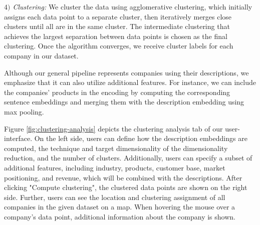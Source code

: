 \documentclass[12pt]{article}
\begin{document}
   \textit{$4)$ Clustering:} We cluster the data using agglomerative clustering, which initially assigns each data point to a separate cluster, then iteratively merges close clusters until all are in the same cluster. The intermediate clustering that achieves the largest separation between data points is chosen as the final clustering. Once the algorithm converges, we receive cluster labels for each company in our dataset.
   
   Although our general pipeline represents companies using their descriptions, we emphasize that it can also utilize additional features. For instance, we can include the companies' products in the encoding by computing the corresponding sentence embeddings and merging them with the description embedding using max pooling.
   
   Figure \ref{fig:clustering-analysis} depicts the clustering analysis tab of our user-interface. On the left side, users can define how the description embeddings are computed, the technique and target dimensionality of the dimensionality reduction, and the number of clusters. Additionally, users can specify a subset of additional features, including industry, products, customer base, market positioning, and revenue, which will be combined with the descriptions. After clicking "Compute clustering", the clustered data points are shown on the right side. Further, users can see the location and clustering assignment of all companies in the given dataset on a map. When hovering the mouse over a company's data point, additional information about the company is shown.
   
\end{document}

